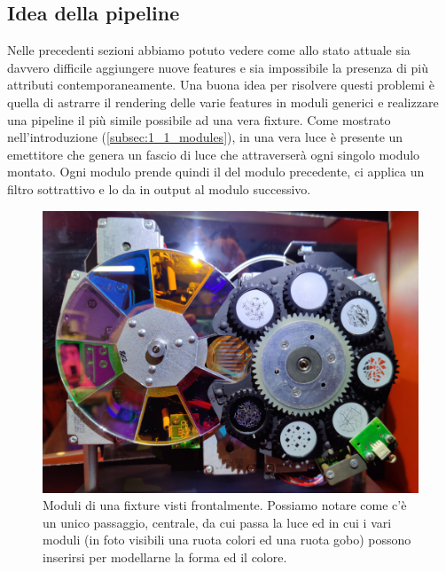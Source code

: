 \documentclass[main.tex]{subfiles}
\begin{document}
\subsection{Idea della pipeline}\label{subsec:2_pipelineIdea}
Nelle precedenti sezioni abbiamo potuto vedere come allo stato attuale sia davvero difficile aggiungere nuove features e sia impossibile la presenza di più attributi contemporaneamente. Una buona idea per risolvere questi problemi è quella di astrarre il rendering delle varie features in moduli generici e realizzare una pipeline il più simile possibile ad una vera fixture. Come mostrato nell'introduzione (\ref{subsec:1_1_modules}), in una vera luce è presente un emettitore che genera un fascio di luce che attraverserà ogni singolo modulo montato. Ogni modulo prende quindi il  del modulo precedente, ci applica un filtro sottrattivo e lo da in output al modulo successivo.
\begin{figure}[H]
    \centering
    \includegraphics[width=.8\linewidth]{img/renderingPipeline/modules.jpg}
    \caption{Moduli di una fixture visti frontalmente. Possiamo notare come c'è un unico passaggio, centrale, da cui passa la luce ed in cui i vari moduli (in foto visibili una ruota colori ed una ruota gobo) possono inserirsi per modellarne la forma ed il colore.}
    \label{fig:2_modules}
\end{figure}
\end{document}
